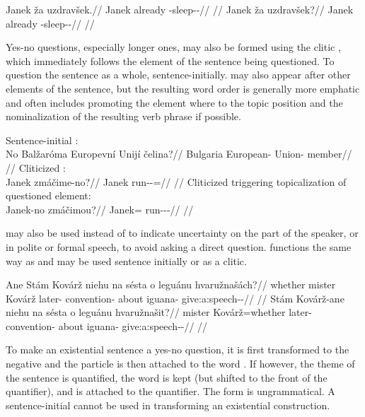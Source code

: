 \pex
\a
\begingl
\gla Janek ža uzdravšek.//
\glb Janek already \Refl{}-sleep-\Av{}-\Pf{}//
\glft {}//
\endgl
\a
\begingl
\gla Janek ža uzdravšek?//
\glb Janek already \Refl{}-sleep-\Av{}-\Pf{}//
\glft {}//
\endgl
\xe

Yes-no questions, especially longer ones, may also be formed using the clitic
, which immediately follows the element of the sentence being
questioned. To question the sentence as a whole,  sentence-initially.
 may also appear after other elements of the sentence, but the resulting
word order is generally more emphatic and often includes promoting the element
where  to the topic position and the nominalization of the resulting
verb phrase if possible.


\pex
\a Sentence-initial :\\
  \begingl
  \gla No Balžaróma Europevní Unijí čelina?//
  \glb \Q{} Bulgaria European-\Att{} Union-\Gen{} member//
  \glft {}//
  \endgl
\a Cliticized :\\
  \begingl
  \gla Janek zmáčime-no?//
  \glb Janek run-\Av{}-\Prog{}=\Q{}//
  \glft {}//
  \endgl
\a Cliticized  triggering topicalization of questioned element:\\
  \begingl
  \gla Janek-no zmáčimou?//
  \glb Janek=\Q{} run-\Av{}-\Prog{}-\Nz{}//
  \glft {}//
  \endgl
\xe

 may also be used instead of  to indicate uncertainty
on the part of the speaker, or in polite or formal speech, to avoid asking a
direct question.  functions the same way as  and may be used
sentence initially or as a clitic.

\pex
\a\begingl
  \gla Ane Stám Kovárž niehu na sésta o leguánu hvaružnašách?//
  \glb whether mister Kovárž later-\Ins{} \Loc{} convention-\Acc{} about iguana-\Ins{} give:a:speech-\Av{}-\Ctp{}//
  \glft {}//
  \endgl
\a\begingl
  \gla Stám Kovárž-ane niehu na sésta o leguánu hvaružnašit?//
  \glb mister Kovárž=whether later-\Ins{} \Loc{} convention-\Acc{} about iguana-\Ins{} give:a:speech-\Av{}-\Sup{}//
  \glft {}//
  \endgl
\xe

To make an existential sentence a yes-no
question, it is first transformed to the negative and the particle 
is then attached to the word . If however, the theme of the sentence
is quantified, the word  is kept (but shifted to
the front of the quantifier), and  is attached to the quantifier. The
form  is ungrammatical. A sentence-initial  cannot be
used in transforming an existential construction.

